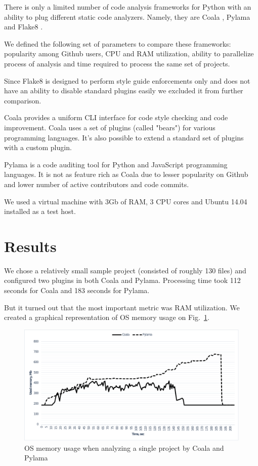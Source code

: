 There is only a limited number of code analysis frameworks for Python with an ability
to plug different static code analyzers. Namely, they are Coala \cite{item13},
Pylama \cite{item14} and Flake8 \cite{item15}.

We defined the following set of parameters to compare these frameworks:
popularity among Github \cite{item16} users, CPU and RAM utilization, ability to
parallelize process of analysis and time required to process the same set of projects.

Since Flake8 is designed to perform style guide enforcements only and does not
have an ability to disable standard plugins easily we excluded it from further comparison.

Coala provides a uniform CLI interface for code style checking and code
improvement. Coala uses a set of plugins (called "bears") for various
programming languages. It's also possible to extend a standard set of
plugins with a custom plugin.

Pylama is a code auditing tool for Python and JavaScript programming
languages. It is not as feature rich as Coala due to lesser popularity
on Github and lower number of active contributors and code commits.

We used a virtual machine with 3Gb of RAM, 3 CPU cores and Ubuntu 14.04
installed as a test host.

\section{Results}

We chose a relatively small sample project (consisted
of roughly 130 files) and configured two plugins in both Coala and Pylama.
Processing time took 112 seconds for Coala and 183 seconds for Pylama.

But it turned out that the most important metric was RAM utilization. We created
a graphical representation of OS memory usage on Fig.~\ref{fig:memusage}.

\begin{figure}[h]
	\centering
	\includegraphics[width=1\linewidth]{memusage}
	\caption{OS memory usage when analyzing a single project by Coala and Pylama}
	\label{fig:memusage}
\end{figure}

